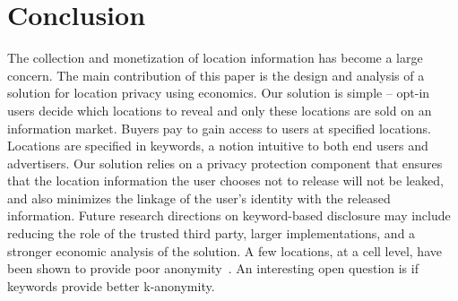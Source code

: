 \section{Conclusion}
\label{sec:conclusion}

The collection and monetization of location information has become a large concern. %
The main contribution of this paper is the design and analysis of a solution for location privacy using economics.
Our solution is simple -- opt-in users decide which locations to reveal and only these locations are sold on an information market. 
Buyers pay to gain access to users at specified locations.
Locations are specified in keywords, a notion intuitive to both end users and advertisers.
Our solution relies on a privacy protection component that ensures that the location information the user chooses not to release will not be leaked, and also minimizes the linkage of the user's identity with the released information. 
Future research  directions on keyword-based disclosure may include reducing the role of the trusted third party, larger implementations, and a stronger economic analysis of the solution.
A few locations, at a cell level, have been shown to provide poor anonymity~\cite{de2013unique}.
An interesting open question is if keywords provide better k-anonymity.

